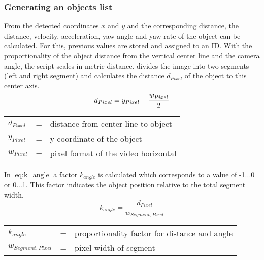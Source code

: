 \subsubsection{Generating an objects list}
From the detected coordinates $x$ and $y$ and the corresponding distance, the distance, velocity, acceleration, yaw angle and yaw rate of the object can be calculated. For this, previous values are stored and assigned to an \ac{ID}. With the proportionality of the object distance from the vertical center line and the camera angle, the script scales in metric distance.
 divides the image into two segments (left and right segment) and calculates the distance $d_{Pixel}$ of the object to this center axis.
\begin{equation}
		d_{Pixel} = y_{Pixel} -  \frac{w_{Pixel}}{2}\\	
		\label{eq:d_Pixel}
\end{equation}
\begin{table}[!h]
	\begin{center}
		\begin{tabular}{l c l}
			$d_{Pixel}$ & = & distance from center line to object\\
			$y_{Pixel}$ & = &  y-coordinate of the object\\
			$w_{Pixel}$ & = & pixel format of the video horizontal\\
		\end{tabular}
	\end{center}
\end{table}


In \cref{eq:k_angle} a factor $k_{angle}$ is calculated which corresponds to a value of -1...0 or 0...1. This factor indicates the object position relative to the total segment width.
\begin{equation}
k_{angle}  = \frac{d_{Pixel}}{w_{Segment,Pixel}}
\label{eq:k_angle}
\end{equation}
\begin{table}[!h]
	\begin{center}
		\begin{tabular}{l c l}
			$k_{angle}$ & = & proportionality factor for distance and angle\\
			$w_{Segment,Pixel}$ & = &  pixel width of segment\\
		\end{tabular}
	\end{center}
\end{table}


